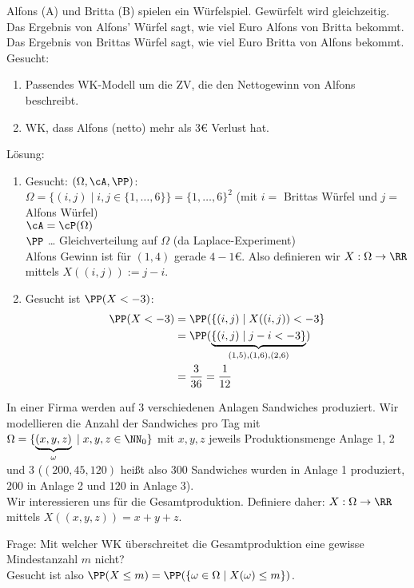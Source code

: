 \documentclass{scrreprt}
\renewenvironment{anumerate}{\begin{enumerate}[label=(\alph*)]}{\end{enumerate}} %
\begin{document}
 Alfons (A) und Britta (B) spielen ein Würfelspiel. Gewürfelt wird gleichzeitig. Das Ergebnis von Alfons' Würfel sagt, wie viel Euro Alfons von Britta bekommt. Das Ergebnis von Brittas Würfel sagt, wie viel Euro Britta von Alfons bekommt.\\
Gesucht:
\begin{anumerate}
\item Passendes WK-Modell um die ZV, die den Nettogewinn von Alfons beschreibt.
\item WK, dass Alfons (netto) mehr als $3$\euro{} Verlust hat.
\end{anumerate}
Lösung:
\begin{anumerate}
\item Gesucht: $(\Omega, \cA, \PP)$:\\
$\Omega = \{(i,j) \;|\; i,j \in \{1,\dots,6\}\}=\{1,\dots,6\}^2$ (mit $i=$ Brittas Würfel und $j=$Alfons Würfel)\\
$\cA = \cP (\Omega)$\\
$\PP$ … Gleichverteilung auf $\Omega$ (da Laplace-Experiment)\\
Alfons Gewinn ist für $(1,4)$ gerade $4-1$\euro{}. Also definieren wir $X: \Omega \to \RR$ mittels $X((i,j)):=j-i$.
\item Gesucht ist $\PP(X<-3)$:
\begin{align*}
\PP(X < -3) &= \PP(\{(i,j) \;|\; X((i,j)) < -3\}\\
&= \PP(\underbrace{\{(i,j)\;|\; j-i < -3\}}_{(1,5), (1,6), (2,6)})\\
&= \frac{3}{36}=\frac{1}{12}
\end{align*}
\end{anumerate}

 In einer Firma werden auf 3 verschiedenen Anlagen Sandwiches produziert. Wir modellieren die Anzahl der Sandwiches pro Tag mit $\Omega = \{ \underbrace{(x,y,z)}_{\omega} \;|\; x,y,z \in \NN_0\}$ mit $x,y,z$ jeweils Produktionsmenge Anlage 1, 2 und 3 ($(200,45,120)$ heißt also $300$ Sandwiches wurden in Anlage 1 produziert, $200$ in Anlage 2 und $120$ in Anlage 3).\\
Wir interessieren uns für die Gesamtproduktion. Definiere daher: $X:\Omega \to \RR$ mittels $X((x,y,z)) = x+ y+z$.

Frage: Mit welcher WK überschreitet die Gesamtproduktion eine gewisse Mindestanzahl $m$ nicht?\\
Gesucht ist also $\PP(X\leq m)=\PP(\{\omega \in \Omega \;|\; X(\omega) \leq m\})$.
\end{document}

